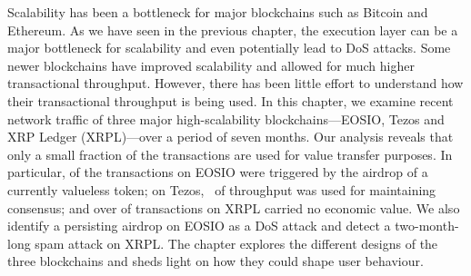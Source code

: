 Scalability has been a bottleneck for major blockchains such as Bitcoin and Ethereum.
As we have seen in the previous chapter, the execution layer can be a major bottleneck for scalability and even potentially lead to DoS attacks.
Some newer blockchains have improved scalability and allowed for much higher transactional throughput.
However, there has been little effort to understand how their transactional throughput is being used. 
In this chapter, we examine recent network traffic of three major high-scalability blockchains---EOSIO, Tezos and XRP Ledger (XRPL)---over a period of seven months.
Our analysis reveals that only a small fraction of the transactions are used for value transfer purposes. In particular,  of the transactions on EOSIO were triggered by the airdrop of a currently valueless token; on Tezos,~ of throughput was used for maintaining consensus; and over  of transactions on XRPL carried no economic value. We also identify a persisting airdrop on EOSIO as a DoS attack and detect a two-month-long spam attack on XRPL.
The chapter explores the different designs of the three blockchains and sheds light on how they could shape user behaviour.
